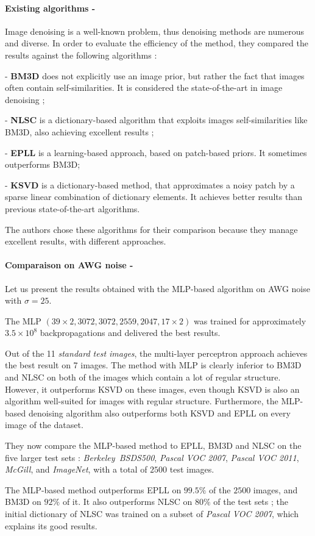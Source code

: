 \documentclass[10pt,a4paper]{article}
\newcommand{\svs}{\vspace{9pt}}
\newcommand{\ourparagraph}[1]{\paragraph{#1}}
\begin{document}
\ourparagraph{Existing algorithms -}{

Image denoising is a well-known problem, thus denoising methods are numerous and diverse. In order to evaluate the efficiency of the method, they compared the results against the following algorithms :

\svs

- \textbf{BM3D} does not explicitly use an image prior, but rather the fact that images often contain self-similarities. It is considered the state-of-the-art in image denoising ;

- \textbf{NLSC} is a dictionary-based algorithm that exploits images self-similarities like BM3D, also achieving excellent results ;

- \textbf{EPLL} is a learning-based approach, based on patch-based priors. It sometimes outperforms BM3D;

- \textbf{KSVD} is a dictionary-based method, that approximates a noisy patch by a sparse linear combination of dictionary elements. It achieves better results than previous state-of-the-art algorithms.

\svs

The authors chose these algorithms for their comparison because they manage excellent results, with different approaches.}

\ourparagraph{Comparaison on AWG noise -}{
Let us present the results obtained with the MLP-based algorithm on AWG noise with $\sigma=25$.

\svs 

The MLP $(39 \times 2, 3072, 3072, 2559, 2047, 17 \times 2)$ was trained for approximately $3.5 \times 10^8$ backpropagations and delivered the best results.

\svs 

Out of the 11 \textit{standard test images}, the multi-layer perceptron approach achieves the best result on 7 images.
The method with MLP is clearly inferior to BM3D and NLSC on both of the images which contain a lot of regular structure. However, it outperforms KSVD on these images, even though KSVD is also an algorithm well-suited for images with regular structure. Furthermore, the MLP-based denoising algorithm also outperforms both KSVD and EPLL on every image of the dataset.

\svs

They now compare the MLP-based method to EPLL, BM3D and NLSC on the five larger test sets : \textit{Berkeley\ BSDS500}, \textit{Pascal VOC 2007}, \textit{Pascal VOC 2011}, \textit{McGill}, and \textit{ImageNet}, with a total of $2500$ test images.

\svs

The MLP-based method outperforms EPLL on $99.5\%$ of the $2500$ images, and BM3D on $92\%$ of it. It also outperforms NLSC on $80\%$ of the test sets ; the initial dictionary of NLSC was trained on a subset of \textit{Pascal VOC 2007}, which explains its good results.}
\end{document}
